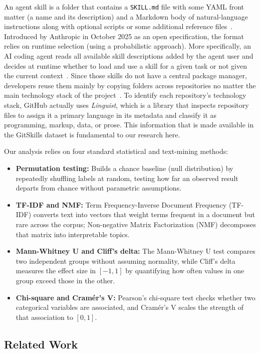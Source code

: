 An agent skill is a folder that contains a \texttt{SKILL.md} file with some YAML front matter (a name and its description) and a Markdown body of natural-language instructions along with optional scripts or some additional reference files~\cite{agentskills_spec,destefanis2027gitskills}. Introduced by Anthropic in October 2025 as an open specification, the format relies on runtime selection (using a probabilistic approach). More specifically, an AI coding agent reads all available skill descriptions added by the agent user and decides at runtime whether to load and use a skill for a given task or not given the current context~\cite{destefanis2027gitskills}. Since those skills do not have a central package manager, developers reuse them mainly by copying folders across repositories no matter the main technology stack of the project~\cite{destefanis2027gitskills}. To identify each repository's technology stack, GitHub actually uses \emph{Linguist}, which is a library that inspects repository files to assign it a primary language in its metadata and classify it as programming, markup, data, or prose. This information that is made available in the GitSkills dataset is fundamental to our research here.

Our analysis relies on four standard statistical and text-mining methods:
\begin{itemize}
    \item \textbf{Permutation testing:} Builds a chance baseline (null distribution) by repeatedly shuffling labels at random, testing how far an observed result departs from chance without parametric assumptions.
    \item \textbf{TF-IDF and NMF:} Term Frequency-Inverse Document Frequency (TF-IDF) converts text into vectors that weight terms frequent in a document but rare across the corpus; Non-negative Matrix Factorization (NMF) decomposes that matrix into interpretable topics.
    \item \textbf{Mann-Whitney U and Cliff's delta:} The Mann-Whitney U test compares two independent groups without assuming normality, while Cliff's delta measures the effect size in $[-1, 1]$ by quantifying how often values in one group exceed those in the other.
    \item \textbf{Chi-square and Cram\'er's V:} Pearson's chi-square test checks whether two categorical variables are associated, and Cram\'er's V scales the strength of that association to $[0, 1]$.
\end{itemize}


\subsection{Related Work}

